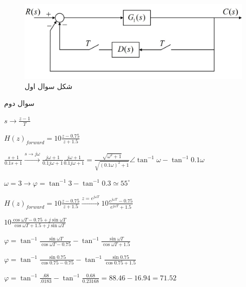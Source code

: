 \documentclass[12pt]{article}
\begin{document}
    \begin{figure}
    	\includegraphics[width=\linewidth]{Resources/3.png}
    	\caption{شکل سوال اول}
    \end{figure}
    
    \begin{problem}{سوال دوم}
    		\raggedleft
    	
    	$s\to \frac{z-1}{T}$
    	
    	
    	$H{{(z)}_{forward}}=10\frac{z-0.75}{z+1.5}$
    	
    	
    	$
    	\frac{s+1}{0.1s+1}\xrightarrow{s\to j\omega }\frac{j\omega +1}{0.1j\omega +1}  
    	\frac{j\omega +1}{0.1j\omega +1}=\frac{\sqrt{{{\omega }^{2}}+1}}{\sqrt{{{(0.1\omega )}^{2}}+1}}\angle {{\tan }^{-1}}\omega -{{\tan }^{-1}}0.1\omega
    	$
    	
    	$
    	\omega =3\to \varphi ={{\tan }^{-1}}3-{{\tan }^{-1}}0.3\simeq {{55}^{\circ }}
    	$
    	
    	$
    	H{{(z)}_{forward}}=10\frac{z-0.75}{z+1.5}\xrightarrow{z={{e}^{j\omega T}}}10\frac{{{e}^{j\omega T}}-0.75}{{{e}^{j\omega T}}+1.5} 	 
    	$
    	
    	$
    	10\frac{\cos \omega T-0.75+j\sin \omega T}{\cos \omega T+1.5+j\sin \omega T}
    	$
    	
    	$  
    	\varphi ={{\tan }^{-1}}\frac{\sin \omega T}{\cos \omega T-0.75}-{{\tan }^{-1}}\frac{\sin \omega T}{\cos \omega T+1.5}
    	$
    	
    	$  
    	\varphi ={{\tan }^{-1}}\frac{\sin 0.75}{\cos 0.75-0.75}-{{\tan }^{-1}}\frac{\sin 0.75}{\cos 0.75+1.5}	 
    	$
    	
    	$
    	\varphi ={{\tan }^{-1}}\frac{.68}{.0183}-{{\tan }^{-1}}\frac{0.68}{0.23168}=88.46 - 16.94 = 71.52
    	$
    	

\end{problem}
\end{document}
